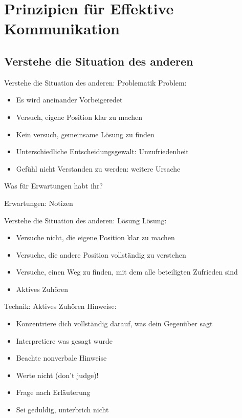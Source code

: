 \section{Prinzipien für Effektive Kommunikation}

\subsection{Verstehe die Situation des anderen}

\begin{frame}[c]{Verstehe die Situation des anderen: Problematik}
    \large
    Problem:
    \begin{itemize}[<+(1)->]
        \item Es wird aneinander Vorbeigeredet
        \item Versuch, eigene Position klar zu machen
        \item Kein versuch, gemeinsame Lösung zu finden
        \item Unterschiedliche Entscheidungsgewalt: Unzufriedenheit
        \item Gefühl nicht Verstanden zu werden: weitere Ursache
    \end{itemize}
\end{frame}

\begin{frame}[c,standout]
    Was für Erwartungen habt ihr?
\end{frame}

\begin{frame}[c]{Erwartungen: Notizen}
    
\end{frame}

\begin{frame}[c]{Verstehe die Situation des anderen: Lösung}
    \large
    Lösung:
    \begin{itemize}[<+(1)->]
        \item Versuche nicht, die eigene Position klar zu machen
        \item Versuche, die andere Position vollständig zu verstehen
        \item Versuche, einen Weg zu finden, mit dem alle beteiligten Zufrieden sind
        \item Aktives Zuhören
    \end{itemize}
\end{frame}


\begin{frame}[c]{Technik: Aktives Zuhören}
    \large
    Hinweise:
    \begin{itemize}[<+(1)->]
        \item Konzentriere dich vollständig darauf, was dein Gegenüber sagt
        \item Interpretiere was gesagt wurde
        \item Beachte nonverbale Hinweise
        \item Werte nicht (don't judge)!
        \item Frage nach Erläuterung
        \item Sei geduldig, unterbrich nicht
    \end{itemize}
\end{frame}


